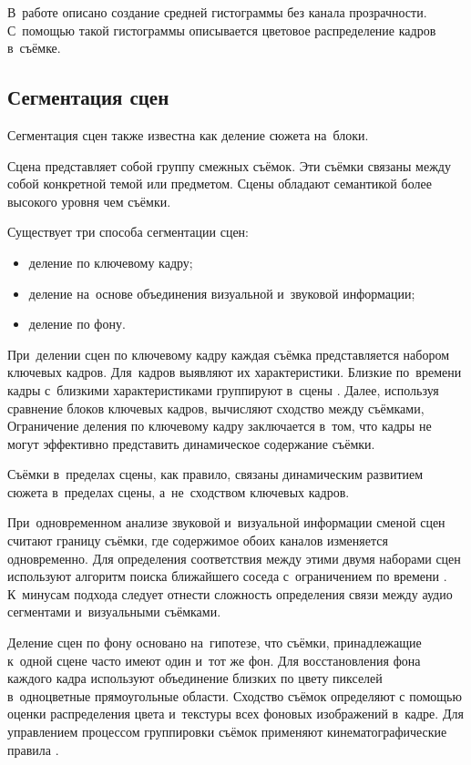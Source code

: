 В~работе \cite{Kazunori:2006} описано создание средней
гистограммы без канала прозрачности.
С~помощью такой гистограммы описывается цветовое распределение кадров в~съёмке.


\subsection{Сегментация сцен}

Сегментация сцен также известна как деление сюжета на~блоки.

Сцена представляет собой группу смежных съёмок.
Эти съёмки связаны между собой конкретной темой или предметом.
Сцены обладают семантикой более высокого уровня чем съёмки.

Существует три способа сегментации сцен:
\begin{itemize}
    \item деление по ключевому кадру;
    \item деление на~основе объединения визуальной и~звуковой информации;
    \item деление по фону.
\end{itemize}

При~делении сцен по ключевому кадру каждая съёмка представляется набором
ключевых кадров. Для~кадров выявляют их характеристики.
Близкие по~времени кадры с~близкими
характеристиками группируют в~сцены \cite{Truong:2003}.
Далее, используя сравнение блоков ключевых кадров,
вычисляют сходство между съёмками,
Ограничение деления по ключевому кадру заключается в~том, что кадры
не могут эффективно представить динамическое содержание съёмки.

Съёмки в~пределах сцены, как правило,
связаны динамическим развитием сюжета в~пределах сцены,
а~не~сходством ключевых кадров.


При~одновременном анализе звуковой и~визуальной информации сменой сцен считают
границу съёмки, где содержимое обоих каналов изменяется одновременно.
Для определения соответствия между этими двумя наборами сцен
используют алгоритм поиска ближайшего соседа
с~ограничением по времени \cite{Sundaram:2000}.
К~минусам подхода следует отнести сложность
определения связи между аудио сегментами и~визуальными съёмками.

Деление сцен по фону основано на~гипотезе, что съёмки,
принадлежащие к~одной сцене часто имеют один и~тот же фон.
Для восстановления фона каждого кадра используют объединение
близких по цвету пикселей в~одноцветные прямоугольные области.
Сходство съёмок определяют с помощью оценки распределения
цвета и~текстуры всех фоновых изображений в~кадре.
Для управлением процессом группировки съёмок
применяют кинематографические правила \cite{Chen:2008}.

